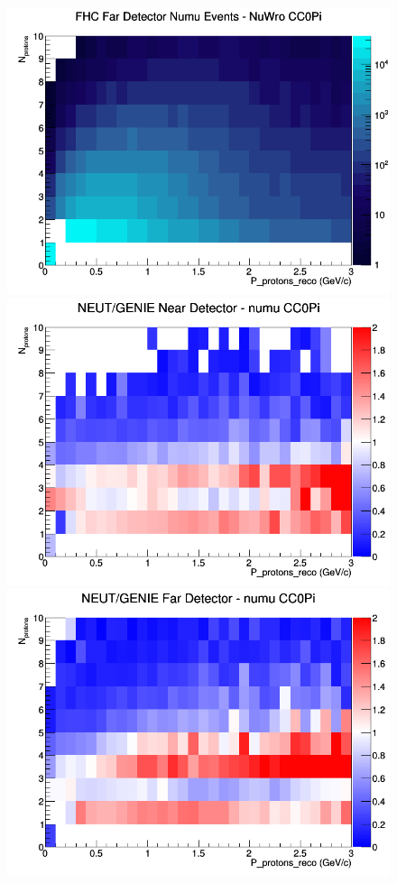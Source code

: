 \documentclass[12pt]{article}
\begin{document}
\begin{figure}[h]
\endminipage
{}
\includegraphics[width=\linewidth]{eff_N_P/FGT/protons/CC0Pi_FHC_FD_numu_N_P_NuWro.png}
\endminipage
\newline
{}
\includegraphics[width=\linewidth]{eff_N_P/FGT/protons/ratios/CC0Pi_NEUT_GENIE_numu_near_N_P.png}
\endminipage
{}
\includegraphics[width=\linewidth]{eff_N_P/FGT/protons/ratios/CC0Pi_NEUT_GENIE_numu_far_N_P.png}

\end{figure}
\end{document}
